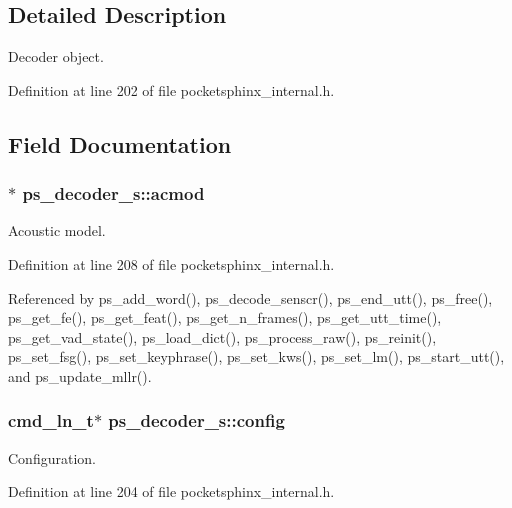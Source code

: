 \subsection{Detailed Description}
Decoder object. 

Definition at line 202 of file pocketsphinx\-\_\-internal.\-h.



\subsection{Field Documentation}
\subsubsection[{acmod}]{$\ast$ ps\-\_\-decoder\-\_\-s\-::acmod}\label{structps__decoder__s_af834d2bc1d44c1d9ef607b025413a0b8}


Acoustic model. 



Definition at line 208 of file pocketsphinx\-\_\-internal.\-h.



Referenced by ps\-\_\-add\-\_\-word(), ps\-\_\-decode\-\_\-senscr(), ps\-\_\-end\-\_\-utt(), ps\-\_\-free(), ps\-\_\-get\-\_\-fe(), ps\-\_\-get\-\_\-feat(), ps\-\_\-get\-\_\-n\-\_\-frames(), ps\-\_\-get\-\_\-utt\-\_\-time(), ps\-\_\-get\-\_\-vad\-\_\-state(), ps\-\_\-load\-\_\-dict(), ps\-\_\-process\-\_\-raw(), ps\-\_\-reinit(), ps\-\_\-set\-\_\-fsg(), ps\-\_\-set\-\_\-keyphrase(), ps\-\_\-set\-\_\-kws(), ps\-\_\-set\-\_\-lm(), ps\-\_\-start\-\_\-utt(), and ps\-\_\-update\-\_\-mllr().

\subsubsection[{config}]{\setlength{\rightskip}{0pt plus 5cm}cmd\-\_\-ln\-\_\-t$\ast$ ps\-\_\-decoder\-\_\-s\-::config}\label{structps__decoder__s_a0565ed97b32408bd05c8104f020cef05}


Configuration. 



Definition at line 204 of file pocketsphinx\-\_\-internal.\-h.



